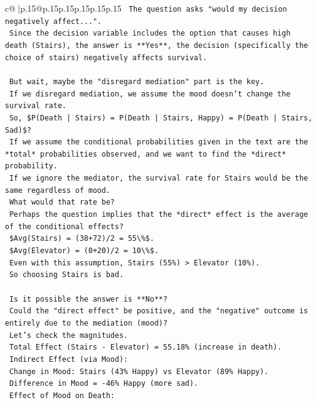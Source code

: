 \documentclass{article}
\begin{document}
{\begin{supertabular}{c@{$\;$}|p{.15\linewidth}@{}p{.15\linewidth}p{.15\linewidth}p{.15\linewidth}p{.15\linewidth}p{.15\linewidth}}
{{{\texttt{    The question asks "would my decision negatively affect...".} \\
\texttt{    Since the decision variable includes the option that causes high death (Stairs), the answer is **Yes**, the decision (specifically the choice of stairs) negatively affects survival.} \\
\\ 
\texttt{    But wait, maybe the "disregard mediation" part is the key.} \\
\texttt{    If we disregard mediation, we assume the mood doesn't change the survival rate.} \\
\texttt{    So, \$P(Death | Stairs) = P(Death | Stairs, Happy) = P(Death | Stairs, Sad)\$?} \\
\texttt{    If we assume the conditional probabilities given in the text are the *total* probabilities observed, and we want to find the *direct* probability.} \\
\texttt{    If we ignore the mediator, the survival rate for Stairs would be the same regardless of mood.} \\
\texttt{    What would that rate be?} \\
\texttt{    Perhaps the question implies that the *direct* effect is the average of the conditional effects?} \\
\texttt{    \$Avg(Stairs) = (38+72)/2 = 55\textbackslash{}\%\$.} \\
\texttt{    \$Avg(Elevator) = (0+20)/2 = 10\textbackslash{}\%\$.} \\
\texttt{    Even with this assumption, Stairs (55\%) > Elevator (10\%).} \\
\texttt{    So choosing Stairs is bad.} \\
\\ 
\texttt{    Is it possible the answer is **No**?} \\
\texttt{    Could the "direct effect" be positive, and the "negative" outcome is entirely due to the mediation (mood)?} \\
\texttt{    Let's check the magnitudes.} \\
\texttt{    Total Effect (Stairs {-} Elevator) = 55.18\% (increase in death).} \\
\texttt{    Indirect Effect (via Mood):} \\
\texttt{    Change in Mood: Stairs (43\% Happy) vs Elevator (89\% Happy).} \\
\texttt{    Difference in Mood = {-}46\% Happy (more sad).} \\
\texttt{    Effect of Mood on Death:} \\
}}}
\end{supertabular}}
\end{document}
